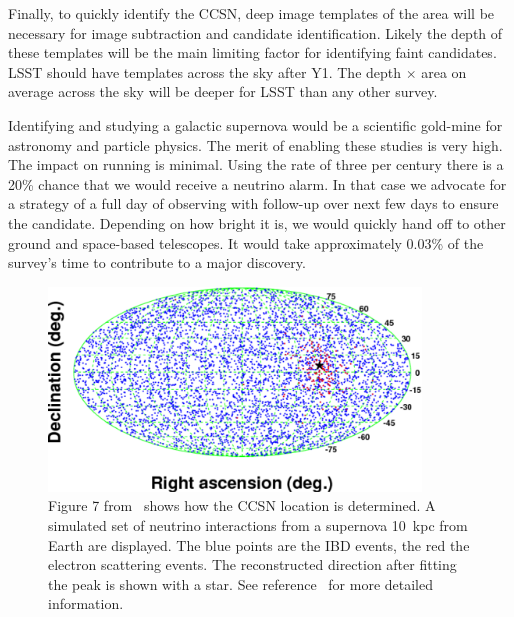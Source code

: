 \documentclass[12pt, letterpaper]{article}
\begin{document}
Finally, to quickly identify the CCSN, deep image templates of the
area will be necessary for image subtraction and candidate
identification.  Likely the depth of these templates will be the main
limiting factor for identifying faint candidates.  LSST should have
templates across the sky after Y1.  The depth $\times$ area on average
across the sky will be deeper for LSST than any other survey.

Identifying and studying a galactic supernova would be a scientific
gold-mine for astronomy and particle physics.  The merit of enabling
these studies is very high. The impact on running is minimal.  Using
the rate of three per century there is a 20\% chance that we would
receive a neutrino alarm. In that case we advocate for a strategy of a
full day of observing with follow-up over next few days to ensure the
candidate.  Depending on how bright it is, we would quickly hand off
to other ground and space-based telescopes.  It would take
approximately 0.03\% of the survey's time to contribute to a major
discovery.

\newpage

\begin{figure}
  \begin{center}
    \includegraphics[width=3.9in]{skymap}
    \caption{Figure 7 from~\cite{2016APh....81...39A} shows how the
      CCSN location is determined. A simulated set of neutrino
      interactions from a supernova 10~kpc from Earth are displayed.
      The blue points are the IBD events, the red the electron
      scattering events.  The reconstructed direction after fitting
      the peak is shown with a star. See
      reference~\cite{2016APh....81...39A} for more detailed
      information. }
    \label{fig:SK-realtime-monitor-pointing}
  \end{center}
\end{figure}
\end{document}
